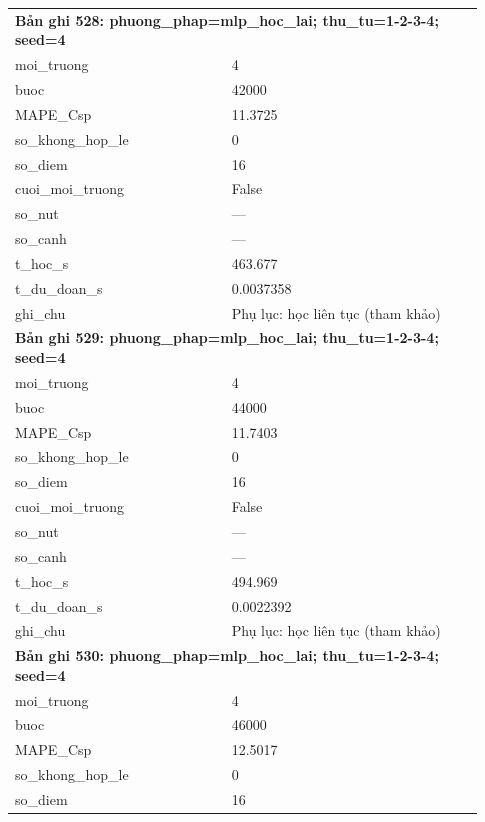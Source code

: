 \begin{longtable}{p{0.43\linewidth}p{0.50\linewidth}}
\midrule
\multicolumn{2}{p{0.95\linewidth}}{\textbf{Bản ghi 528: phuong\_phap=mlp\_hoc\_lai; thu\_tu=1-2-3-4; seed=4}} \\
moi\_\allowbreak truong & 4 \\
buoc & 42000 \\
MAPE\_\allowbreak Csp & 11.3725 \\
so\_\allowbreak khong\_\allowbreak hop\_\allowbreak le & 0 \\
so\_\allowbreak diem & 16 \\
cuoi\_\allowbreak moi\_\allowbreak truong & False \\
so\_\allowbreak nut & — \\
so\_\allowbreak canh & — \\
t\_\allowbreak hoc\_\allowbreak s & 463.677 \\
t\_\allowbreak du\_\allowbreak doan\_\allowbreak s & 0.0037358 \\
ghi\_\allowbreak chu & Phụ lục: học liên tục (tham khảo) \\
\midrule
\multicolumn{2}{p{0.95\linewidth}}{\textbf{Bản ghi 529: phuong\_phap=mlp\_hoc\_lai; thu\_tu=1-2-3-4; seed=4}} \\
moi\_\allowbreak truong & 4 \\
buoc & 44000 \\
MAPE\_\allowbreak Csp & 11.7403 \\
so\_\allowbreak khong\_\allowbreak hop\_\allowbreak le & 0 \\
so\_\allowbreak diem & 16 \\
cuoi\_\allowbreak moi\_\allowbreak truong & False \\
so\_\allowbreak nut & — \\
so\_\allowbreak canh & — \\
t\_\allowbreak hoc\_\allowbreak s & 494.969 \\
t\_\allowbreak du\_\allowbreak doan\_\allowbreak s & 0.0022392 \\
ghi\_\allowbreak chu & Phụ lục: học liên tục (tham khảo) \\
\midrule
\multicolumn{2}{p{0.95\linewidth}}{\textbf{Bản ghi 530: phuong\_phap=mlp\_hoc\_lai; thu\_tu=1-2-3-4; seed=4}} \\
moi\_\allowbreak truong & 4 \\
buoc & 46000 \\
MAPE\_\allowbreak Csp & 12.5017 \\
so\_\allowbreak khong\_\allowbreak hop\_\allowbreak le & 0 \\
so\_\allowbreak diem & 16 \\

\end{longtable}
